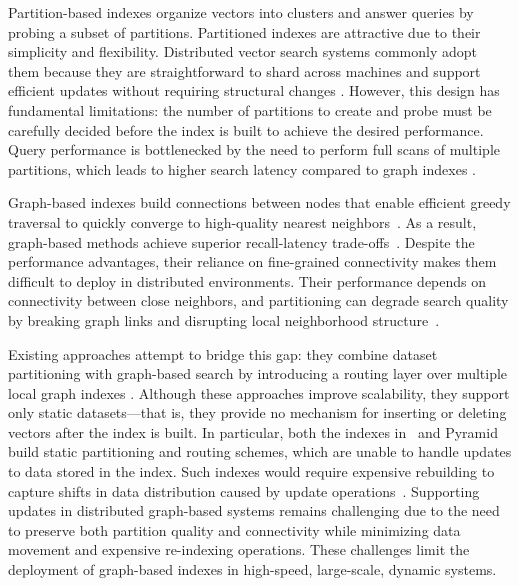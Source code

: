 \documentclass[sigconf,review,anonymous]{acmart}
\begin{document}
Partition-based indexes organize vectors into clusters and answer queries by probing a subset of partitions. Partitioned indexes are attractive due to their simplicity and flexibility. Distributed vector search systems commonly adopt them because they are straightforward to shard across machines and support efficient updates without requiring structural changes \cite{chen2021spann, xu2023spfresh, mohoney2025quake}. However, this design has fundamental limitations: the number of partitions to create and probe must be carefully decided before the index is built to achieve the desired performance. Query performance is bottlenecked by the need to perform full scans of multiple partitions, which leads to higher search latency compared to graph indexes \cite{wang2021comprehensive, aumuller2020ann, li2020annsurvey}.

Graph-based indexes build connections between nodes that enable efficient greedy traversal to quickly converge to high-quality nearest neighbors~\cite{malkov2018efficient, fu2019nsg, jayaram2019diskann}. As a result, graph-based methods achieve superior recall-latency trade-offs~\cite{li2020annsurvey, wang2021comprehensive, aumuller2020ann}. Despite the performance advantages, their reliance on fine-grained connectivity makes them difficult to deploy in distributed environments. Their performance depends on connectivity between close neighbors, and partitioning can degrade search quality by breaking graph links and disrupting local neighborhood structure~\cite{gottesbueren2025unleashing, deng2019pyramid}.

Existing approaches attempt to bridge this gap: they combine dataset partitioning with graph-based search by introducing a routing layer over multiple local graph indexes \cite{gottesbueren2025unleashing, deng2019pyramid}. Although these approaches improve scalability, they support only static datasets---that is, they provide no mechanism for inserting or deleting vectors after the index is built. In particular, both the indexes in~\cite{gottesbueren2025unleashing} and Pyramid~\cite{deng2019pyramid} build static partitioning and routing schemes, which are unable to handle updates to data stored in the index. Such indexes would require expensive rebuilding to capture shifts in data distribution caused by update operations~\cite{singh2021freshdiskann, xu2023spfresh, mohoney2025quake}. Supporting updates in distributed graph-based systems remains challenging due to the need to preserve both partition quality and connectivity while minimizing data movement and expensive re-indexing operations. These challenges limit the deployment of graph-based indexes in high-speed, large-scale, dynamic systems.
\end{document}
